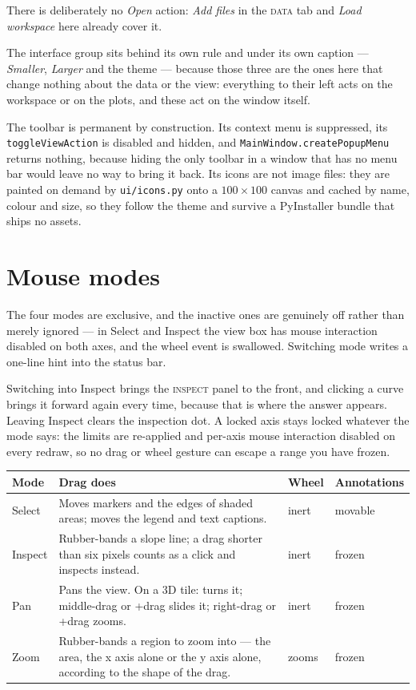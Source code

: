 \documentclass[11pt,a4paper,oneside]{report}
\newcommand{\code}[1]{\texttt{#1}}
\newcommand{\key}[1]{\textsf{\small\fbox{#1}}}
\newcommand{\tab}[1]{\textsc{#1}}
\begin{document}
There is deliberately no \emph{Open} action: \emph{Add files} in the \tab{data}
tab and \emph{Load workspace} here already cover it.

The interface group sits behind its own rule and under its own caption ---
\emph{Smaller}, \emph{Larger} and the theme --- because those three are the
ones here that change nothing about the data or the view: everything to their
left acts on the workspace or on the plots, and these act on the window
itself.

The toolbar is permanent by construction. Its context menu is suppressed, its
\code{toggleViewAction} is disabled and hidden, and
\code{MainWindow.createPopupMenu} returns nothing, because hiding the only
toolbar in a window that has no menu bar would leave no way to bring it back.
Its icons are not image files: they are painted on demand by
\code{ui/icons.py} onto a $100\times100$ canvas and cached by name, colour and
size, so they follow the theme and survive a PyInstaller bundle that ships no
assets.

\section{Mouse modes}

The four modes are exclusive, and the inactive ones are genuinely off rather
than merely ignored --- in Select and Inspect the view box has mouse interaction
disabled on both axes, and the wheel event is swallowed. Switching mode writes a
one-line hint into the status bar.

Switching into Inspect brings the \tab{inspect} panel to the front, and clicking
a curve brings it forward again every time, because that is where the answer
appears. Leaving Inspect clears the inspection dot. A locked axis stays locked
whatever the mode says: the limits are re-applied and per-axis mouse interaction
disabled on every redraw, so no drag or wheel gesture can escape a range you have
frozen.

\begin{center}
\small
\begin{tabular}{@{}p{}p{}p{}p{}@{}}
\toprule
\textbf{Mode} & \textbf{Drag does} & \textbf{Wheel} & \textbf{Annotations} \\
\midrule
Select & Moves markers and the edges of shaded areas; moves the legend and text captions. & inert & movable \\
Inspect & Rubber-bands a slope line; a drag shorter than six pixels counts as a click and inspects instead. & inert & frozen \\
Pan & Pans the view. On a 3D tile: turns it; middle-drag or \key{Shift}+drag slides it; right-drag or \key{Ctrl}+drag zooms. & inert & frozen \\
Zoom & Rubber-bands a region to zoom into --- the area, the x axis alone or the y axis alone, according to the shape of the drag. & zooms & frozen \\
\bottomrule
\end{tabular}
\end{center}
\end{document}
